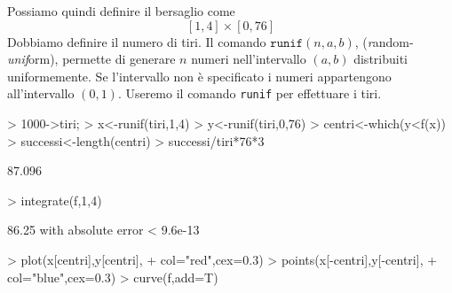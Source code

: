 \documentclass[onecolumn,11pt]{book}
\begin{document}
Possiamo quindi definire il bersaglio come
$$[1,4]\times [0,76]$$
Dobbiamo definire il numero di tiri. 
Il comando $\texttt{runif}(n,a,b)$, ({\it r}andom-{\it unif}orm), permette di generare $n$ numeri nell'intervallo $(a,b)$ distribuiti uniformemente. Se l'intervallo non \`e specificato i numeri appartengono all'intervallo $(0,1)$.
Useremo il comando  \texttt{runif} per effettuare i tiri.

\par
\begin{Schunk}
\begin{Sinput}
> 1000->tiri;
> x<-runif(tiri,1,4)		 
> y<-runif(tiri,0,76)
> centri<-which(y<f(x))	 
> successi<-length(centri)
> successi/tiri*76*3                    
\end{Sinput}
\begin{Soutput}
[1] 87.096
\end{Soutput}
\begin{Sinput}
> integrate(f,1,4)
\end{Sinput}
\begin{Soutput}
86.25 with absolute error < 9.6e-13
\end{Soutput}
\begin{Sinput}
> plot(x[centri],y[centri],
+ col="red",cex=0.3)   
> points(x[-centri],y[-centri],
+ col="blue",cex=0.3)  
> curve(f,add=T)		
\end{Sinput}
\end{Schunk}
\end{document}
